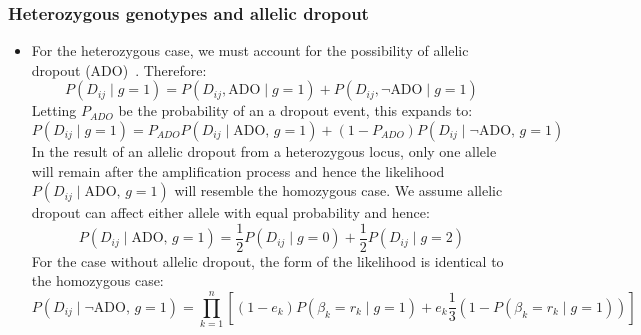 \documentclass[../main.tex]{subfiles}
\begin{document}
\subsubsection*{Heterozygous genotypes and allelic dropout}
\begin{itemize}
     \item For the heterozygous case, we must account for the possibility of allelic dropout (ADO)~\cite{monovar,sciphi}. Therefore:
     \begin{equation*}
         P(D_{ij}\mid g=1) = P(D_{ij}, \text{ADO} \mid g=1)+ P(D_{ij}, \neg \text{ADO}\mid g=1)
     \end{equation*}
     Letting $P_{ADO}$ be the probability of an a dropout event, this expands to:
     \begin{equation*}
         P(D_{ij}\mid g=1) = P_{ADO}P(D_{ij}\mid \text{ADO},\, g=1) + (1-P_{ADO})P(D_{ij} \mid \neg \text{ADO},\, g=1)
     \end{equation*}
     In the result of an allelic dropout from a heterozygous locus, only one allele will remain after the amplification process and hence the likelihood $P(D_{ij}\mid \text{ADO},\, g=1)$ will resemble the homozygous case. We assume allelic dropout can affect either  allele with equal probability and hence:
     \begin{equation*}
         P(D_{ij}\mid \text{ADO},\, g=1) =\frac{1}{2}P(D_{ij}\mid g=0) + \frac{1}{2}P(D_{ij}\mid g=2)
     \end{equation*}
     For the case without allelic dropout, the form of the likelihood is identical to the homozygous case:
     \begin{equation*}
           P(D_{ij}\mid \neg\text{ADO},\,g=1) = \prod_{k=1}^n \left[ (1-e_k)P(\beta_k=r_k\mid g=1) + e_k \frac{1}{3} (1-P(\beta_k=r_k\mid g=1)) \right]
     \end{equation*}
\end{itemize}
\end{document}
